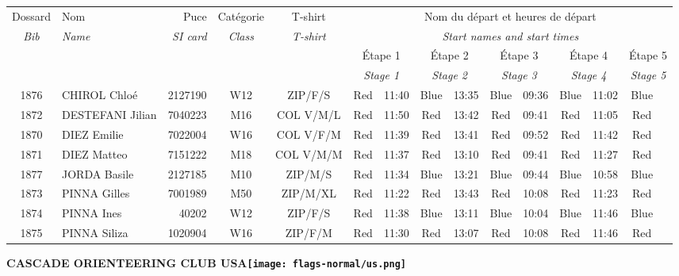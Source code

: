 \documentclass{report}
\begin{document}
  \begin{longtable}{|c|l|r|c|c|*{5}{cc|}}
    Dossard & Nom  & Puce    & Catégorie & T-shirt & \multicolumn{10}{c|}{Nom du départ et heures de départ} \\
    \itshape Bib     & \itshape Name & \itshape SI card & \itshape Class  & \itshape  T-shirt  & \multicolumn{10}{c|}{\itshape Start names and start times} \\
    \hline
    & & & & & \multicolumn{2}{c|}{Étape 1} & \multicolumn{2}{c|}{Étape 2} & \multicolumn{2}{c|}{Étape 3} & \multicolumn{2}{c|}{Étape 4} & \multicolumn{2}{c|}{Étape 5} \\
    & & & & & \multicolumn{2}{c|}{\itshape Stage 1} & \multicolumn{2}{c|}{\itshape Stage 2} & \multicolumn{2}{c|}{\itshape Stage 3} & \multicolumn{2}{c|}{\itshape Stage 4} & \multicolumn{2}{c|}{\itshape Stage 5} \\
    \hline
    1876 & CHIROL Chloé & 2127190 & W12 & ZIP/F/S & Red & 11:40 & Blue & 13:35 & Blue & 09:36 & Blue & 11:02 & Blue &  \\
    1872 & DESTEFANI Jilian & 7040223 & M16 & COL V/M/L & Red & 11:50 & Red & 13:42 & Red & 09:41 & Red & 11:05 & Red &  \\
    1870 & DIEZ Emilie & 7022004 & W16 & COL V/F/M & Red & 11:39 & Red & 13:41 & Red & 09:52 & Red & 11:42 & Red &  \\
    1871 & DIEZ Matteo & 7151222 & M18 & COL V/M/M & Red & 11:37 & Red & 13:10 & Red & 09:41 & Red & 11:27 & Red &  \\
    1877 & JORDA Basile & 2127185 & M10 & ZIP/M/S & Red & 11:34 & Blue & 13:21 & Blue & 09:44 & Blue & 10:58 & Blue &  \\
    1873 & PINNA Gilles & 7001989 & M50 & ZIP/M/XL & Red & 11:22 & Red & 13:43 & Red & 10:08 & Red & 11:23 & Red &  \\
    1874 & PINNA Ines & 40202 & W12 & ZIP/F/S & Red & 11:38 & Blue & 13:11 & Blue & 10:04 & Blue & 11:46 & Blue &  \\
    1875 & PINNA Siliza & 1020904 & W16 & ZIP/F/M & Red & 11:30 & Red & 13:07 & Red & 10:08 & Red & 11:46 & Red &  \\
  \end{longtable}
\newpage
  \Huge \centering \bfseries CASCADE ORIENTEERING CLUB  USA\normalfont \footnotesize \sffamily \hfill \texttt{[image: flags-normal/us.png]} \newline 
\end{document}
